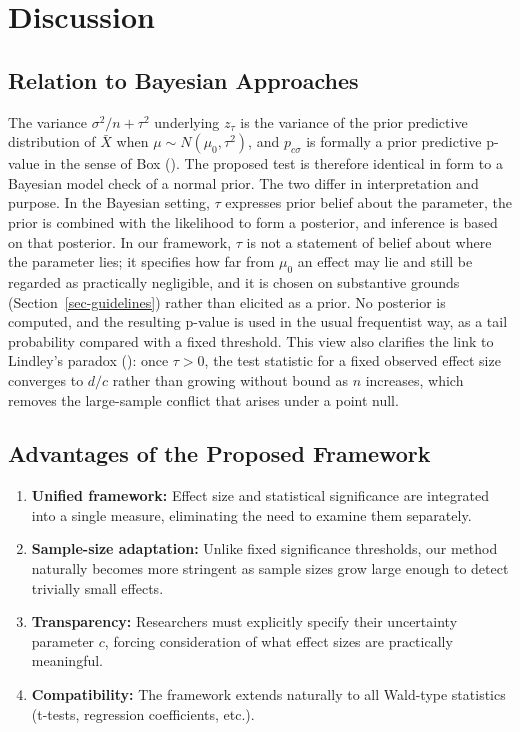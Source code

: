 \documentclass[
  11pt,
  letterpaper,
]{article}
\begin{document}
\section{Discussion}\label{sec-discussion}

\subsection{Relation to Bayesian
Approaches}\label{relation-to-bayesian-approaches}

The variance \(\sigma^2/n + \tau^2\) underlying \(z_\tau\) is the
variance of the prior predictive distribution of \(\bar{X}\) when
\(\mu \sim N(\mu_0, \tau^2)\), and \(p_{c\sigma}\) is formally a prior
predictive p-value in the sense of Box
(). The proposed test is
therefore identical in form to a Bayesian model check of a normal prior.
The two differ in interpretation and purpose. In the Bayesian setting,
\(\tau\) expresses prior belief about the parameter, the prior is
combined with the likelihood to form a posterior, and inference is based
on that posterior. In our framework, \(\tau\) is not a statement of
belief about where the parameter lies; it specifies how far from
\(\mu_0\) an effect may lie and still be regarded as practically
negligible, and it is chosen on substantive grounds
(Section~\ref{sec-guidelines}) rather than elicited as a prior. No
posterior is computed, and the resulting p-value is used in the usual
frequentist way, as a tail probability compared with a fixed threshold.
This view also clarifies the link to Lindley's paradox
(): once
\(\tau > 0\), the test statistic for a fixed observed effect size
converges to \(d/c\) rather than growing without bound as \(n\)
increases, which removes the large-sample conflict that arises under a
point null.

\subsection{Advantages of the Proposed
Framework}\label{advantages-of-the-proposed-framework}

\begin{enumerate}
\def\labelenumi{\arabic{enumi}.}
\item
  \textbf{Unified framework:} Effect size and statistical significance
  are integrated into a single measure, eliminating the need to examine
  them separately.
\item
  \textbf{Sample-size adaptation:} Unlike fixed significance thresholds,
  our method naturally becomes more stringent as sample sizes grow large
  enough to detect trivially small effects.
\item
  \textbf{Transparency:} Researchers must explicitly specify their
  uncertainty parameter \(c\), forcing consideration of what effect
  sizes are practically meaningful.
\item
  \textbf{Compatibility:} The framework extends naturally to all
  Wald-type statistics (t-tests, regression coefficients, etc.).
\end{enumerate}
\end{document}
